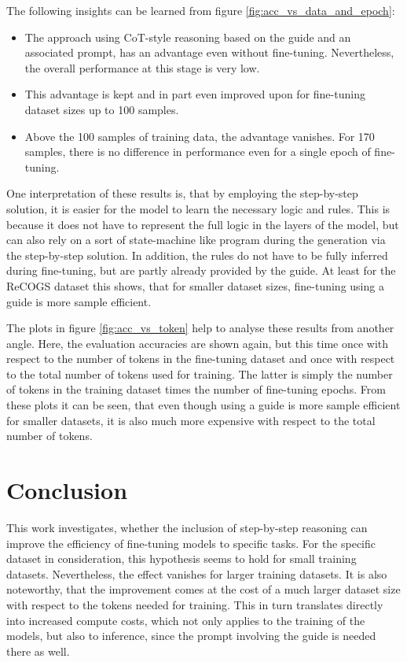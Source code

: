 \documentclass[11pt]{article}
\begin{document}
    The following insights can be learned from figure \ref{fig:acc_vs_data_and_epoch}:
    \begin{itemize}
        \item The approach using CoT-style reasoning based on the guide and an associated prompt, has an advantage even
        without fine-tuning.
        Nevertheless, the overall performance at this stage is very low.
        \item This advantage is kept and in part even improved upon for fine-tuning dataset sizes up to 100 samples.
        \item Above the 100 samples of training data, the advantage vanishes.
        For 170 samples, there is no difference in performance even for a single epoch of fine-tuning.
    \end{itemize}

    One interpretation of these results is, that by employing the step-by-step solution, it is easier for the model to
    learn the necessary logic and rules.
    This is because it does not have to represent the full logic in the layers of the model, but can also rely on a sort of
    state-machine like program during the generation via the step-by-step solution.
    In addition, the rules do not have to be fully inferred during fine-tuning, but are partly already provided by the guide.
    At least for the ReCOGS dataset this shows, that for smaller dataset sizes, fine-tuning using a guide is
    more sample efficient.

    The plots in figure \ref{fig:acc_vs_token} help to analyse these results from another angle.
    Here, the evaluation accuracies are shown again, but this time once with respect to the number of tokens in the fine-tuning
    dataset and once with respect to the total number of tokens used for training.
    The latter is simply the number of tokens in the training dataset times the number of fine-tuning epochs.
    From these plots it can be seen, that even though using a guide is more sample efficient for smaller datasets,
    it is also much more expensive with respect to the total number of tokens.


    \section{Conclusion}\label{sec:conclusion}
    This work investigates, whether the inclusion of step-by-step reasoning can improve the efficiency of fine-tuning
    models to specific tasks.
    For the specific dataset in consideration, this hypothesis seems to hold for small training datasets.
    Nevertheless, the effect vanishes for larger training datasets.
    It is also noteworthy, that the improvement comes at the cost of a much larger dataset size with respect to the tokens
    needed for training.
    This in turn translates directly into increased compute costs, which not only applies to the training of the models,
    but also to inference, since the prompt involving the guide is needed there as well.
\end{document}
